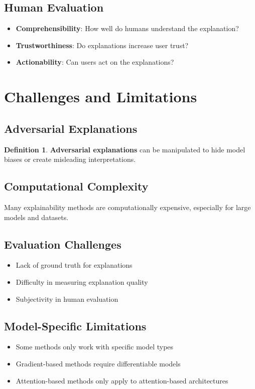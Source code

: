 \documentclass[11pt]{article}
\theoremstyle{definition}
\newtheorem{definition}{Definition}[section]
\begin{document}
\subsection{Human Evaluation}
\begin{itemize}
    \item \textbf{Comprehensibility}: How well do humans understand the explanation?
    \item \textbf{Trustworthiness}: Do explanations increase user trust?
    \item \textbf{Actionability}: Can users act on the explanations?
\end{itemize}

\section{Challenges and Limitations}

\subsection{Adversarial Explanations}
\begin{definition}
\textbf{Adversarial explanations} can be manipulated to hide model biases or create misleading interpretations.
\end{definition}

\subsection{Computational Complexity}
Many explainability methods are computationally expensive, especially for large models and datasets.

\subsection{Evaluation Challenges}
\begin{itemize}
    \item Lack of ground truth for explanations
    \item Difficulty in measuring explanation quality
    \item Subjectivity in human evaluation
\end{itemize}

\subsection{Model-Specific Limitations}
\begin{itemize}
    \item Some methods only work with specific model types
    \item Gradient-based methods require differentiable models
    \item Attention-based methods only apply to attention-based architectures
\end{itemize}
\end{document}
